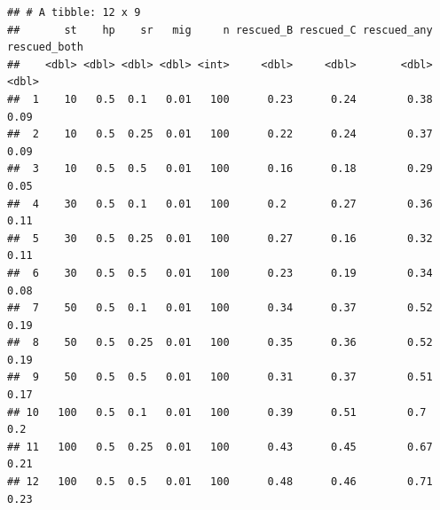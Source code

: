 \documentclass[
]{article}
\newenvironment{Shaded}{\begin{snugshade}}{\end{snugshade}}
\newcommand{\AttributeTok}[1]{\textcolor[rgb]{0.13,0.29,0.53}{#1}}
\newcommand{\CommentTok}[1]{\textcolor[rgb]{0.56,0.35,0.01}{\textit{#1}}}
\newcommand{\DecValTok}[1]{\textcolor[rgb]{0.00,0.00,0.81}{#1}}
\newcommand{\FloatTok}[1]{\textcolor[rgb]{0.00,0.00,0.81}{#1}}
\newcommand{\FunctionTok}[1]{\textcolor[rgb]{0.13,0.29,0.53}{\textbf{#1}}}
\newcommand{\NormalTok}[1]{#1}
\newcommand{\OtherTok}[1]{\textcolor[rgb]{0.56,0.35,0.01}{#1}}
\newcommand{\SpecialCharTok}[1]{\textcolor[rgb]{0.81,0.36,0.00}{\textbf{#1}}}
\begin{document}
\begin{Shaded}
\end{Shaded}

\begin{verbatim}
## # A tibble: 12 x 9
##       st    hp    sr   mig     n rescued_B rescued_C rescued_any rescued_both
##    <dbl> <dbl> <dbl> <dbl> <int>     <dbl>     <dbl>       <dbl>        <dbl>
##  1    10   0.5  0.1   0.01   100      0.23      0.24        0.38         0.09
##  2    10   0.5  0.25  0.01   100      0.22      0.24        0.37         0.09
##  3    10   0.5  0.5   0.01   100      0.16      0.18        0.29         0.05
##  4    30   0.5  0.1   0.01   100      0.2       0.27        0.36         0.11
##  5    30   0.5  0.25  0.01   100      0.27      0.16        0.32         0.11
##  6    30   0.5  0.5   0.01   100      0.23      0.19        0.34         0.08
##  7    50   0.5  0.1   0.01   100      0.34      0.37        0.52         0.19
##  8    50   0.5  0.25  0.01   100      0.35      0.36        0.52         0.19
##  9    50   0.5  0.5   0.01   100      0.31      0.37        0.51         0.17
## 10   100   0.5  0.1   0.01   100      0.39      0.51        0.7          0.2 
## 11   100   0.5  0.25  0.01   100      0.43      0.45        0.67         0.21
## 12   100   0.5  0.5   0.01   100      0.48      0.46        0.71         0.23
\end{verbatim}
\end{document}
